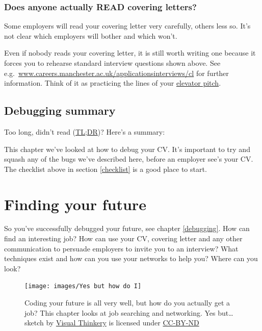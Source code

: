\documentclass[
]{book}
\begin{document}
\hypertarget{elevatorpitch}{%
\subsection{Does anyone actually READ covering letters?}\label{elevatorpitch}}

Some employers will read your covering letter very carefully, others less so. It's not clear which employers will bother and which won't.

Even if nobody reads your covering letter, it is still worth writing one because it forces you to rehearse standard interview questions shown above. See e.g.~\href{https://www.careers.manchester.ac.uk/applicationsinterviews/cl/}{www.careers.manchester.ac.uk/applicationsinterviews/cl} for further information. Think of it as practicing the lines of your \href{https://en.wikipedia.org/wiki/Elevator_pitch}{elevator pitch}.

\hypertarget{tldr7}{%
\section{Debugging summary}\label{tldr7}}

Too long, didn't read (\href{https://en.wiktionary.org/wiki/too_long;_didn\%27t_read}{TL;DR})? Here's a summary:

This chapter we've looked at how to debug your CV. It's important to try and squash any of the bugs we've described here, before an employer see's your CV. The checklist above in section \ref{checklist} is a good place to start.

\hypertarget{finding}{%
\chapter{Finding your future}\label{finding}}

So you've successfully debugged your future, see chapter \ref{debugging}. How can find an interesting job? How can use your CV, covering letter and any other communication to persuade employers to invite you to an interview? What techniques exist and how can you use your networks to help you? Where can you look? 🔭

\begin{figure}

{\centering \texttt{[image: images/Yes but how do I]} 

}

\caption{Coding your future is all very well, but how do you actually get a job? This chapter looks at job searching and networking. Yes but\ldots{} sketch by \href{https://visualthinkery.com}{Visual Thinkery} is licensed under \href{https://creativecommons.org/licenses/by-nd/4.0/}{CC-BY-ND}}\label{fig:yesbut-fig}
\end{figure}
\end{document}
